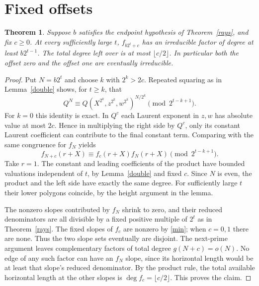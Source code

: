 \documentclass[11pt]{article}
\newtheorem{theorem}{Theorem}
\begin{document}
\section{Fixed offsets}
\begin{theorem}\label{offset}
Suppose $b$ satisfies the endpoint hypothesis of Theorem~\ref{rays}, and fix $c\ge0$. At every sufficiently large $t$, $f_{b2^t+c}$ has an irreducible factor of degree at least $b2^{t-1}$. The total degree left over is at most $\lfloor c/2\rfloor$. In particular both the offset zero and the offset one are eventually irreducible.
\end{theorem}
\begin{proof}
Put $N=b2^t$ and choose $k$ with $2^k>2c$. Repeated squaring as in Lemma~\ref{double} shows, for $t\ge k$, that
\[
 Q^{N}\equiv Q(X^{2^k},z^{2^k},w^{2^k})^{N/2^k}\pmod{2^{t-k+1}}.
\]
For $k=0$ this identity is exact. In $Q^c$ each Laurent exponent in $z,w$ has absolute value at most $2c$. Hence in multiplying the right side by $Q^c$, only its constant Laurent coefficient can contribute to the final constant term. Comparing with the same congruence for $f_N$ yields
\[
 f_{N+c}(r+X)\equiv f_c(r+X) f_N(r+X)\pmod{2^{t-k+1}}.
\]
Take $r=1$. The constant and leading coefficients of the product have bounded valuations independent of $t$, by Lemma~\ref{double} and fixed $c$. Since $N$ is even, the product and the left side have exactly the same degree. For sufficiently large $t$ their lower polygons coincide, by the height argument in the lemma.

The nonzero slopes contributed by $f_N$ shrink to zero, and their reduced denominators are all divisible by a fixed positive multiple of $2^t$ as in Theorem~\ref{rays}. The fixed slopes of $f_c$ are nonzero by \eqref{min}; when $c=0,1$ there are none. Thus the two slope sets eventually are disjoint. The next-prime argument leaves complementary factors of total degree $g(N+c)=o(N)$. No edge of any such factor can have an $f_N$ slope, since its horizontal length would be at least that slope's reduced denominator. By the product rule, the total available horizontal length at the other slopes is $\deg f_c=\lfloor c/2\rfloor$. This proves the claim.\end{proof}
\end{document}
